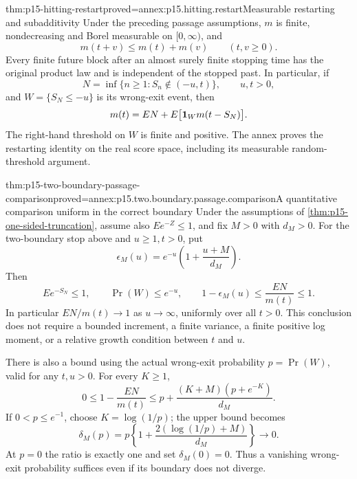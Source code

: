 \begin{hblemma}{thm:p15-hitting-restart}{proved=annex:p15.hitting.restart}{Measurable restarting and subadditivity}
Under the preceding passage assumptions, \(m\) is finite,
nondecreasing and Borel measurable on \([0,\infty)\), and
\[
 m(t+v)\leq m(t)+m(v)\qquad(t,v\geq0).
\]
Every finite future block after an almost surely finite stopping time
has the original product law and is independent of the stopped past.
In particular, if
\[
 N=\inf\{n\geq1:S_n\notin(-u,t)\},\qquad u,t>0,
\]
and \(W=\{S_N\leq-u\}\) is its wrong-exit event, then
\[
 m(t)=EN+E\bigl[{\bf1}_W m(t-S_N)\bigr].
\]
The right-hand threshold on \(W\) is finite and positive.
The annex proves the restarting identity on the real score space,
including its measurable random-threshold argument.
\end{hblemma}

\begin{hbtheorem}{thm:p15-two-boundary-passage-comparison}{proved=annex:p15.two.boundary.passage.comparison}{A quantitative comparison uniform in the correct boundary}
Under the assumptions of \cref{thm:p15-one-sided-truncation}, assume
also \(Ee^{-Z}\leq1\), and fix \(M>0\) with \(d_M>0\).
For the two-boundary stop above and \(u\geq1,t>0\), put
\[
 \epsilon_M(u)=e^{-u}\left(1+\frac{u+M}{d_M}\right).
\]
Then
\[
 E e^{-S_N}\leq1,\qquad \Pr(W)\leq e^{-u},\qquad
 1-\epsilon_M(u)\leq\frac{EN}{m(t)}\leq1.
\]
In particular \(EN/m(t)\to1\) as \(u\to\infty\), uniformly over
all \(t>0\). This conclusion does not require a bounded increment,
a finite variance, a finite positive log moment, or a relative
growth condition between \(t\) and \(u\).

There is also a bound using the actual wrong-exit probability \(p=\Pr(W)\),
valid for any \(t,u>0\). For every \(K\geq1\),
\[
 0\leq1-\frac{EN}{m(t)}
 \leq p+\frac{(K+M)(p+e^{-K})}{d_M}.
\]
If \(0<p\leq e^{-1}\), choose \(K=\log(1/p)\); the upper bound becomes
\[
 \delta_M(p)=p\left\{1+\frac{2(\log(1/p)+M)}{d_M}\right\}\longrightarrow0.
\]
At \(p=0\) the ratio is exactly one and set \(\delta_M(0)=0\).
Thus a vanishing wrong-exit probability suffices even if its boundary
does not diverge.
\end{hbtheorem}

